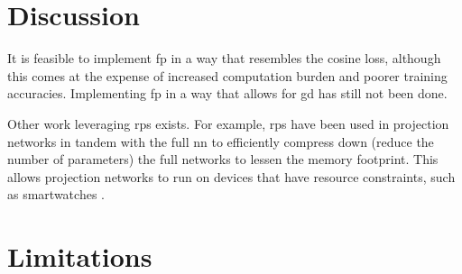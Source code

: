 \section{Discussion}

It is feasible to implement \gls{fp} in a way that resembles the cosine loss, although this comes at the expense of increased computation burden and poorer training accuracies. Implementing \gls{fp} in a way that allows for \gls{gd} has still not been done.
\bigskip

Other work leveraging \gls{rp}s exists. For example, \gls{rp}s have been used in projection networks in tandem with the full \gls{nn} to efficiently compress down (reduce the number of parameters) the full networks to lessen the memory footprint. This allows projection networks to run on devices that have resource constraints, such as smartwatches \cite{projection_net}. 
\bigskip

\section{Limitations}